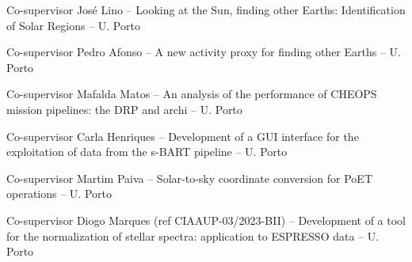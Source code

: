 
\begin{rubric}{}


\entry*[\dates{2022-10/2023-11}]
	Co-supervisor  José Lino -- Looking at the Sun, finding other Earths: Identification of Solar Regions -- U. Porto


\entry*[\dates{2022-11/2023-02}]
	Co-supervisor   Pedro Afonso -- A new activity proxy for finding other Earths -- U. Porto

\entry*[\dates{2020-02/2020-06}]
	Co-supervisor   Mafalda Matos -- An analysis of the performance of CHEOPS mission pipelines: the DRP and archi -- U. Porto


	Co-supervisor   Carla Henriques -- Development of a GUI interface for the exploitation of data from the s-BART pipeline  -- U. Porto

	Co-supervisor   Martim Paiva -- Solar-to-sky coordinate conversion for PoET operations  -- U. Porto


\entry*[\dates{2023-03/2023-06}]
	Co-supervisor   Diogo Marques (ref CIAAUP-03/2023-BII) -- Development of a tool for the normalization of stellar spectra: application to ESPRESSO data  -- U. Porto


\end{rubric}
